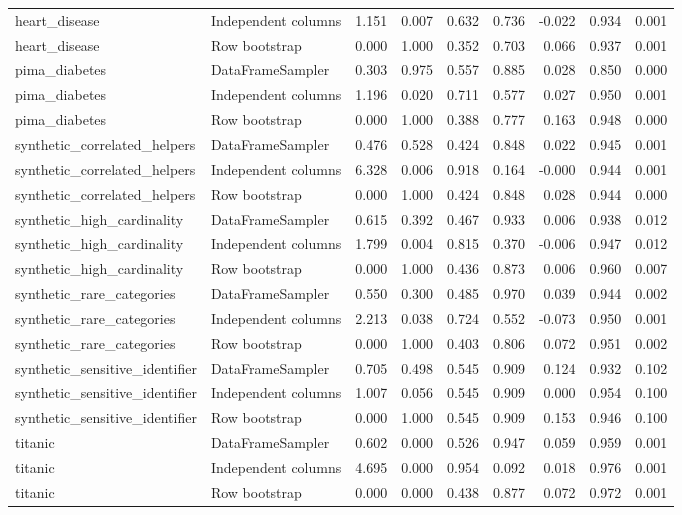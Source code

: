 \begin{table}
\begin{adjustbox}{max width=\textwidth}
\begin{tabular}{llrrrrrrr}
heart\_disease & Independent columns & 1.151 & 0.007 & 0.632 & 0.736 & -0.022 & 0.934 & 0.001 \\
heart\_disease & Row bootstrap & 0.000 & 1.000 & 0.352 & 0.703 & 0.066 & 0.937 & 0.001 \\
pima\_diabetes & DataFrameSampler & 0.303 & 0.975 & 0.557 & 0.885 & 0.028 & 0.850 & 0.000 \\
pima\_diabetes & Independent columns & 1.196 & 0.020 & 0.711 & 0.577 & 0.027 & 0.950 & 0.001 \\
pima\_diabetes & Row bootstrap & 0.000 & 1.000 & 0.388 & 0.777 & 0.163 & 0.948 & 0.000 \\
synthetic\_correlated\_helpers & DataFrameSampler & 0.476 & 0.528 & 0.424 & 0.848 & 0.022 & 0.945 & 0.001 \\
synthetic\_correlated\_helpers & Independent columns & 6.328 & 0.006 & 0.918 & 0.164 & -0.000 & 0.944 & 0.001 \\
synthetic\_correlated\_helpers & Row bootstrap & 0.000 & 1.000 & 0.424 & 0.848 & 0.028 & 0.944 & 0.000 \\
synthetic\_high\_cardinality & DataFrameSampler & 0.615 & 0.392 & 0.467 & 0.933 & 0.006 & 0.938 & 0.012 \\
synthetic\_high\_cardinality & Independent columns & 1.799 & 0.004 & 0.815 & 0.370 & -0.006 & 0.947 & 0.012 \\
synthetic\_high\_cardinality & Row bootstrap & 0.000 & 1.000 & 0.436 & 0.873 & 0.006 & 0.960 & 0.007 \\
synthetic\_rare\_categories & DataFrameSampler & 0.550 & 0.300 & 0.485 & 0.970 & 0.039 & 0.944 & 0.002 \\
synthetic\_rare\_categories & Independent columns & 2.213 & 0.038 & 0.724 & 0.552 & -0.073 & 0.950 & 0.001 \\
synthetic\_rare\_categories & Row bootstrap & 0.000 & 1.000 & 0.403 & 0.806 & 0.072 & 0.951 & 0.002 \\
synthetic\_sensitive\_identifier & DataFrameSampler & 0.705 & 0.498 & 0.545 & 0.909 & 0.124 & 0.932 & 0.102 \\
synthetic\_sensitive\_identifier & Independent columns & 1.007 & 0.056 & 0.545 & 0.909 & 0.000 & 0.954 & 0.100 \\
synthetic\_sensitive\_identifier & Row bootstrap & 0.000 & 1.000 & 0.545 & 0.909 & 0.153 & 0.946 & 0.100 \\
titanic & DataFrameSampler & 0.602 & 0.000 & 0.526 & 0.947 & 0.059 & 0.959 & 0.001 \\
titanic & Independent columns & 4.695 & 0.000 & 0.954 & 0.092 & 0.018 & 0.976 & 0.001 \\
titanic & Row bootstrap & 0.000 & 0.000 & 0.438 & 0.877 & 0.072 & 0.972 & 0.001 \\
\bottomrule
\end{tabular}
\end{adjustbox}
\end{table}
